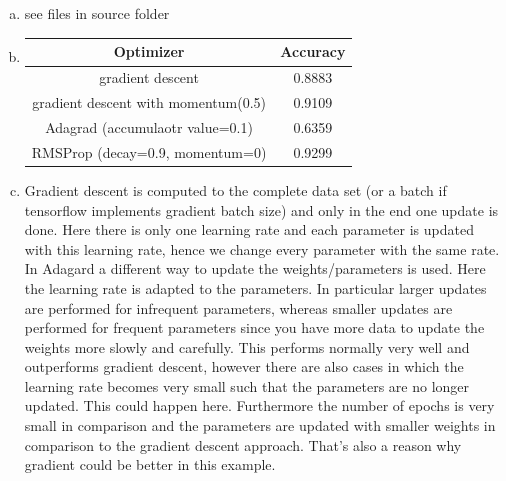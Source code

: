 \documentclass[12pt]{article}
\begin{document}

\setcounter{section}{7}
\setcounter{subsection}{0}

\subsection{ }

\begin{enumerate}[a)]
	\item see files in source folder
	
	\item 
		\begin{tabular}{|c|c|}
			\hline
 		 	Optimizer & Accuracy \\
 		 	\hline
 		 	gradient descent & 0.8883 \\
 		 	\hline
 		 	gradient descent with momentum(0.5) & 0.9109 \\
 		 	\hline
 		 	Adagrad (accumulaotr value=0.1) & 0.6359\\
 		 	\hline
 		 	RMSProp (decay=0.9, momentum=0) & 0.9299 \\
 		 	\hline
 		\end{tabular}
 		
 	\item 
 	Gradient descent is computed to the complete data set (or a batch if tensorflow implements gradient batch size) and only in the end one update is done. Here there is only one learning rate and each parameter is updated with this learning rate, hence we change every parameter with the same rate.\\
 	In Adagard a different way to update the weights/parameters is used. Here the learning rate is adapted to the parameters. In particular larger updates are performed for infrequent parameters, whereas smaller updates are performed for frequent parameters since you have more data to update the weights more slowly and carefully. This performs normally very well and outperforms gradient descent, however there are also cases in which the learning rate becomes very small such that the parameters are no longer updated. This could happen here. Furthermore the number of epochs is very small in comparison and the parameters are updated with smaller weights in comparison to the gradient descent approach. That's also a reason why gradient could be better in this example.\\
\end{enumerate}


\subsection{ }
\end{document}
